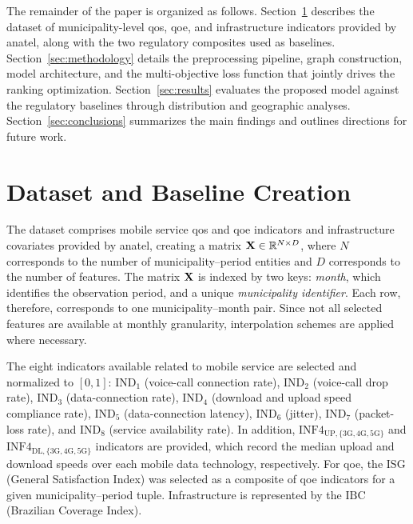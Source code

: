 \documentclass[english]{sbrt}
\begin{document}
The remainder of the paper is organized as follows. Section~\ref{sec:dataset}
describes the dataset of municipality-level \gls{qos}, \gls{qoe}, and
infrastructure indicators provided by \gls{anatel}, along with the two
regulatory composites used as baselines. Section~\ref{sec:methodology} details
the preprocessing pipeline, graph construction, model architecture, and the
multi-objective loss function that jointly drives the ranking optimization.
Section~\ref{sec:results} evaluates the proposed model against the regulatory
baselines through distribution and geographic analyses.
Section~\ref{sec:conclusions} summarizes the main findings and outlines
directions for future work.

\section{Dataset and Baseline Creation} \label{sec:dataset}

The dataset comprises mobile service \gls{qos} and \gls{qoe} indicators and
infrastructure covariates provided by \gls{anatel}, creating a matrix $\mathbf{X} \in
\mathbb{R}^{N \times D}$, where $N$ corresponds to the number of
municipality--period entities and $D$ corresponds to the number of features. The
matrix $\mathbf{X}$ is indexed by two keys: \textit{month}, which identifies the
observation period, and a unique \textit{municipality identifier}. Each row,
therefore, corresponds to one municipality--month pair. Since not all selected
features are available at monthly granularity, interpolation schemes are applied
where necessary.

The eight indicators available related to mobile service are selected and
normalized to $[0,1]$: $\mathrm{IND}_1$ (voice-call connection rate),
$\mathrm{IND}_2$ (voice-call drop rate), $\mathrm{IND}_3$ (data-connection
rate), $\mathrm{IND}_4$ (download and upload speed compliance rate),
$\mathrm{IND}_5$ (data-connection latency), $\mathrm{IND}_6$ (jitter),
$\mathrm{IND}_7$ (packet-loss rate), and $\mathrm{IND}_8$ (service availability
rate). In addition, $\mathrm{INF4}_{\mathrm{UP},\{\mathrm{3G,4G,5G}\}}$ and
$\mathrm{INF4}_{\mathrm{DL},\{\mathrm{3G,4G,5G}\}}$ indicators are provided,
which record the median upload and download speeds over each mobile data
technology, respectively. For \gls{qoe}, the $\mathrm{ISG}$ (General
Satisfaction Index) was selected as a composite of \gls{qoe} indicators for a
given municipality--period tuple. Infrastructure is represented by the
$\mathrm{IBC}$ (Brazilian Coverage Index).
\end{document}
